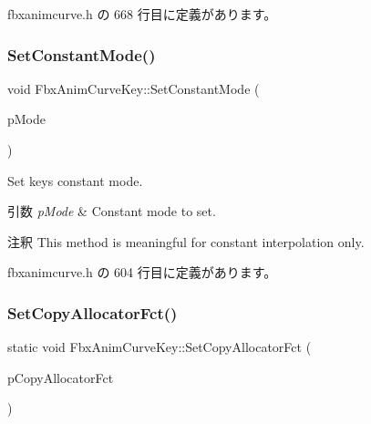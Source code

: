  fbxanimcurve.\+h の 668 行目に定義があります。

\mbox{\label{class_fbx_anim_curve_key_a6a34c333a4b4f90cf04492c9c31bedcb}} 
\subsubsection{\texorpdfstring{Set\+Constant\+Mode()}{SetConstantMode()}}
{\footnotesize\ttfamily void Fbx\+Anim\+Curve\+Key\+::\+Set\+Constant\+Mode (\begin{DoxyParamCaption}\item[{\hyperlink{class_fbx_anim_curve_def_a52885abd392ac8ac3da94bafc5fddd64}{Fbx\+Anim\+Curve\+Def\+::\+E\+Constant\+Mode}}]{p\+Mode }\end{DoxyParamCaption})\hspace{0.3cm}{\ttfamily [inline]}}

Set key\textquotesingle{}s constant mode. 
\begin{DoxyParams}{引数}
{\em p\+Mode} & Constant mode to set. \\
\hline
\end{DoxyParams}
\begin{DoxyRemark}{注釈}
This method is meaningful for constant interpolation only. 
\end{DoxyRemark}


 fbxanimcurve.\+h の 604 行目に定義があります。

\mbox{\label{class_fbx_anim_curve_key_a39c27002f753b9f743c5883b0c0f6278}} 
\subsubsection{\texorpdfstring{Set\+Copy\+Allocator\+Fct()}{SetCopyAllocatorFct()}}
{\footnotesize\ttfamily static void Fbx\+Anim\+Curve\+Key\+::\+Set\+Copy\+Allocator\+Fct (\begin{DoxyParamCaption}\item[{\hyperlink{class_fbx_anim_curve_key___impl}{Fbx\+Anim\+Curve\+Key\+\_\+\+Impl} $\ast$($\ast$)(\hyperlink{class_fbx_anim_curve_key___impl}{Fbx\+Anim\+Curve\+Key\+\_\+\+Impl} $\ast$)}]{p\+Copy\+Allocator\+Fct }\end{DoxyParamCaption})\hspace{0.3cm}{\ttfamily [static]}}

